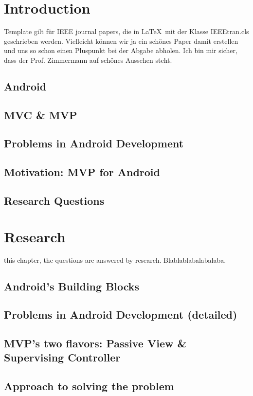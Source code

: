\section{Introduction}
% 
% 
% 

 Template gilt f\"ur IEEE journal papers, die in \LaTeX\ mit der Klasse
IEEEtran.cls geschrieben werden.
Vielleicht k\"onnen wir ja ein sch\"ones Paper damit erstellen und uns so schon einen Pluspunkt bei der Abgabe abholen. Ich bin mir sicher, dass der Prof. Zimmermann auf sch\"ones Aussehen steht.


	\subsection{Android}
	
	\subsection{MVC \& MVP}
	
	\subsection{Problems in Android Development}
	
	\subsection{Motivation: MVP for Android}
	
	\subsection{Research Questions}
	
\section{Research}

 this chapter, the questions are answered by research. Blablablabalabalaba.

	\subsection{Android's Building Blocks}
	
	\subsection{Problems in Android Development (detailed)}
	
	\subsection{MVP's two flavors: Passive View \& Supervising Controller}
	
	\subsection{Approach to solving the problem}
	
	